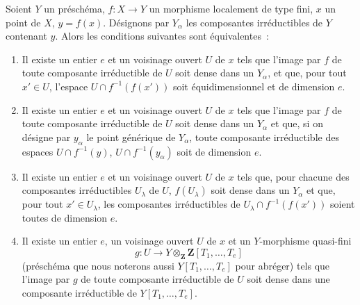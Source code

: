 \begin{proposition}[13.3.1]
\label{IV.13.3.1-fr}
Soient $Y$ un préschéma, $f:X\to Y$ un morphisme localement de type fini,
$x$ un point de $X$, $y=f(x)$. Désignons par $Y_\alpha$ les composantes
irréductibles de $Y$ contenant $y$. Alors les conditions suivantes sont
équivalentes~:
\begin{enumerate}[label=\emph{\alph*)}]
  \item Il existe un entier $e$ et un voisinage ouvert $U$ de $x$ tels que
  l'image par $f$ de toute composante irréductible de $U$ soit dense dans un
  $Y_\alpha$, et que, pour tout $x'\in U$, l'espace
  $U\cap f^{-1}(f(x'))$ soit équidimensionnel et de dimension $e$.
  \item[\emph{a$'$)}] Il existe un entier $e$ et un voisinage ouvert $U$ de
  $x$ tels que l'image par $f$ de toute composante irréductible de $U$ soit
  dense dans un $Y_\alpha$ et que, si on désigne par $y_\alpha$ le point
  générique de $Y_\alpha$, toute composante irréductible des espaces
  $U\cap f^{-1}(y)$, $U\cap f^{-1}(y_\alpha)$ soit de dimension $e$.
  \item[\emph{a$''$)}] Il existe un entier $e$ et un voisinage ouvert $U$ de
  $x$ tels que, pour chacune des composantes irréductibles $U_\lambda$ de
  $U$, $f(U_\lambda)$ soit dense dans un $Y_\alpha$ et que, pour tout
  $x'\in U_\lambda$, les composantes irréductibles de
  $U_\lambda\cap f^{-1}(f(x'))$ soient toutes de dimension $e$.
  \item Il existe un entier $e$, un voisinage ouvert $U$ de $x$ et un
  $Y$-morphisme quasi-fini
  \[
    g:U\longrightarrow Y\otimes_{\mathbf Z}\mathbf Z[T_1,\ldots,T_e]
  \]
  (préschéma que nous noterons aussi $Y[T_1,\ldots,T_e]$ pour abréger) tels
  que l'image par $g$ de toute composante irréductible de $U$ soit dense dans
  une composante irréductible de $Y[T_1,\ldots,T_e]$.
\end{enumerate}
\end{proposition}


